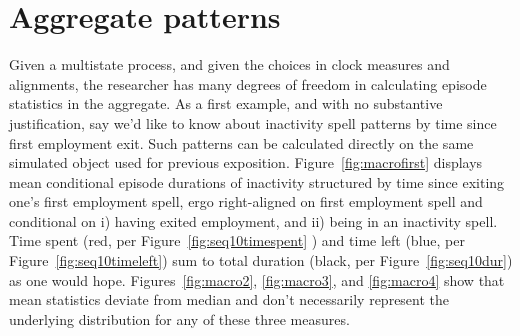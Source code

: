 \documentclass{article}
\begin{document}
\FloatBarrier
\section{Aggregate patterns}
Given a multistate process, and given the choices in clock measures and
alignments, the researcher has many degrees of freedom in calculating episode
statistics in the aggregate. As a first example, and with no substantive
justification, say we'd like to know about inactivity spell patterns by time
since first employment exit. Such patterns can be calculated directly on the
same simulated object used for previous exposition.
Figure~\ref{fig:macrofirst} displays mean conditional episode durations of
inactivity structured by time since exiting one's first employment spell, ergo
right-aligned on first employment spell and conditional on i) having exited
employment, and ii) being in an inactivity spell. Time spent (red, per
Figure~\ref{fig:seq10timespent} ) and time left (blue, per
Figure~\ref{fig:seq10timeleft}) sum to total duration
(black, per
Figure~\ref{fig:seq10dur}) as one would hope.
Figures~\ref{fig:macro2}, \ref{fig:macro3}, and \ref{fig:macro4} show that mean
statistics deviate from median and don't necessarily represent the underlying
distribution for any of these three measures. 
\end{document}
